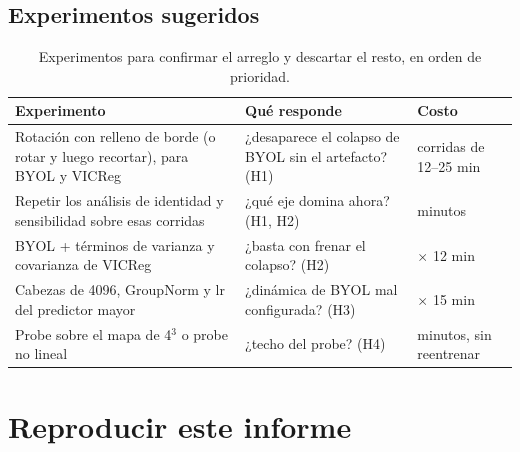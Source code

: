 \documentclass[11pt,a4paper]{article}
\begin{document}
\subsection{Experimentos sugeridos}

\begin{table}[H]
\centering
\small
\begin{tabularx}{\textwidth}{>{\raggedright\arraybackslash}p{5.2cm}>{\raggedright\arraybackslash}X>{\raggedright\arraybackslash}p{2.2cm}}
\toprule
Experimento & Qué responde & Costo \\
\midrule
Rotación con relleno de borde (o rotar y luego recortar), para BYOL y VICReg & ¿desaparece el colapso de BYOL sin el artefacto? (H1) & 6 corridas de 12--25 min \\
Repetir los análisis de identidad y sensibilidad sobre esas corridas & ¿qué eje domina ahora? (H1, H2) & minutos \\
BYOL + términos de varianza y covarianza de VICReg & ¿basta con frenar el colapso? (H2) & 3 $\times$ 12 min \\
Cabezas de 4096, GroupNorm y lr del predictor mayor & ¿dinámica de BYOL mal configurada? (H3) & 3 $\times$ 15 min \\
Probe sobre el mapa de 4$^3$ o probe no lineal & ¿techo del probe? (H4) & minutos, sin reentrenar \\
\bottomrule
\end{tabularx}
\caption{Experimentos para confirmar el arreglo y descartar el resto, en orden de prioridad.}
\end{table}

\appendix
\section{Reproducir este informe}
\label{sec:repro}
\end{document}
